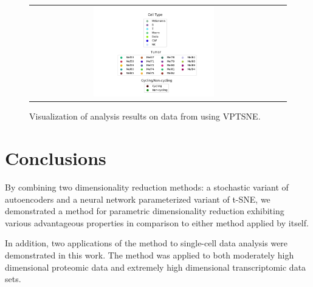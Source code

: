 \begin{figure}[!htb]
\begin{tabular}{cc}
    \includegraphics[width=0.5\textwidth]{images/tirosh_all_legends.png} \\
  \end{tabular}
  \caption{Visualization of analysis results on data from \cite{tirosh} using VPTSNE.}
  \label{fig:tirosh}
\end{figure}

\chapter{Conclusions}
\label{ch:conclusions}

By combining two dimensionality reduction methods: a stochastic variant of autoencoders and a neural network parameterized variant of t-SNE, we demonstrated a method for parametric dimensionality reduction exhibiting various advantageous properties in comparison to either method applied by itself. 

In addition, two applications of the method to single-cell data analysis were demonstrated in this work. The method was applied to both moderately high dimensional proteomic data and extremely high dimensional transcriptomic data sets. 



\ifnameyear
  
\else
  
\fi


